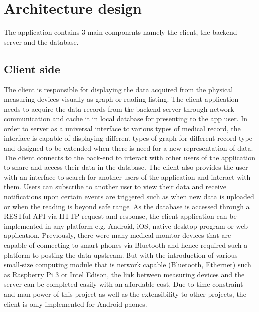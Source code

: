 \section{Architecture design}
\label{sec:Architecture design}
The application contains 3 main components namely the client, the backend server and the database.

\subsection{Client side}
The client is responsible for displaying the data acquired from the physical measuring devices visually as graph or
reading listing. The client application needs to acquire the data records from the backend server through network
communication and cache it in local database for presenting to the app user. In order to server as a universal interface to
various types of medical record, the interface is capable of displaying different types of graph for different record
type and designed to be extended when there is need for a new representation of data. The client connects 
to the back-end to interact with other users of the application to share and access their data in the database. The
client also provides the user with an interface to search for another users of the application and interact with them.
Users can subscribe to another user to view their data and receive notifications upon certain events are triggered such
as when new data is uploaded or when the reading is beyond safe range. As the database is accessed through a RESTful API
via HTTP request and response, the client application can be implemented in any platform e.g. Android, iOS, native
desktop program or web application. Previously, there were many medical monitor devices that are capable of connecting
to smart phones via Bluetooth and hence required such a platform to posting the data upstream. But with the introduction
of various small-size computing module that is network capable (Bluetooth, Ethernet) such as Raspberry Pi 3 or Intel
Edison, the link between measuring devices and the server can be completed easily with an affordable cost. Due to time
constraint and man power of this project as well as the extensibility to other projects, the client is only implemented
for Android phones.

